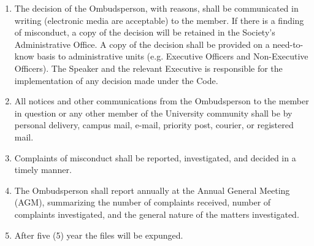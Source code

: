 \begin{enumerate} [align=left]
\item The decision of the Ombudsperson, with reasons, shall be communicated in writing (electronic media are acceptable) to the member. If there is a finding of misconduct, a copy of the decision will be retained in the Society's Administrative Office. A copy of the decision shall be provided on a need-to- know basis to administrative units (e.g. Executive Officers and Non-Executive Officers). The Speaker and the relevant Executive is responsible for the implementation of any decision made under the Code.
\item All notices and other communications from the Ombudsperson to the member in question or any other member of the University community shall be by personal delivery, campus mail, e-mail, priority post, courier, or registered mail.
\item Complaints of misconduct shall be reported, investigated, and decided in a timely manner. 
\item The Ombudsperson shall report annually at the Annual General Meeting (AGM), summarizing the number of complaints received, number of complaints investigated, and the general nature of the matters investigated.
\item After five (5) year the files will be expunged.
\end{enumerate}

